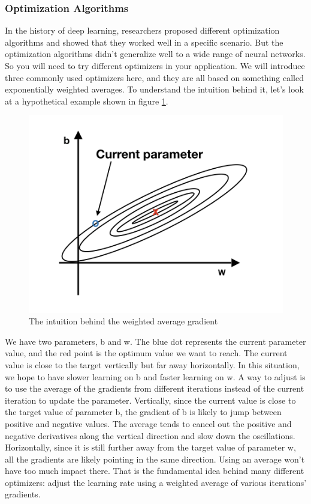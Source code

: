 \documentclass[12pt,]{krantz}
\begin{document}
\hypertarget{optimization-algorithms}{%
\subsubsection{Optimization Algorithms}\label{optimization-algorithms}}

In the history of deep learning, researchers proposed different optimization algorithms and showed that they worked well in a specific scenario. But the optimization algorithms didn't generalize well to a wide range of neural networks. So you will need to try different optimizers in your application. We will introduce three commonly used optimizers here, and they are all based on something called exponentially weighted averages. To understand the intuition behind it, let's look at a hypothetical example shown in figure \ref{fig:weightedagv}.

\begin{figure}

{\centering \includegraphics[width=0.6\linewidth]{images/weighted_agv} 

}

\caption{The intuition behind the weighted average gradient}\label{fig:weightedagv}
\end{figure}

We have two parameters, b and w. The blue dot represents the current parameter value, and the red point is the optimum value we want to reach. The current value is close to the target vertically but far away horizontally. In this situation, we hope to have slower learning on b and faster learning on w. A way to adjust is to use the average of the gradients from different iterations instead of the current iteration to update the parameter. Vertically, since the current value is close to the target value of parameter b, the gradient of b is likely to jump between positive and negative values. The average tends to cancel out the positive and negative derivatives along the vertical direction and slow down the oscillations. Horizontally, since it is still further away from the target value of parameter w, all the gradients are likely pointing in the same direction. Using an average won't have too much impact there. That is the fundamental idea behind many different optimizers: adjust the learning rate using a weighted average of various iterations' gradients.
\end{document}
